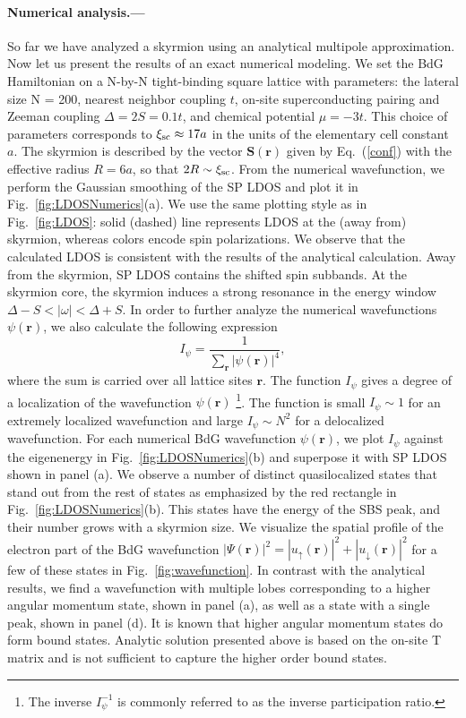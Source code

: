 \documentclass[twocolumn,showpacs,floatfix,longbibliography]{revtex4-1}
\begin{document}
\paragraph*{Numerical analysis.---} \label{sec:numerics}
So far we have analyzed a skyrmion using an analytical multipole approximation. Now let us present the results of an exact numerical modeling. We set the BdG Hamiltonian on a N-by-N tight-binding square lattice with parameters: the lateral size N = 200, nearest neighbor coupling $t$, on-site superconducting pairing and Zeeman coupling $\Delta=2S=0.1t$, and chemical potential $\mu = -3t$. This choice of parameters corresponds to $\xi_{\rm sc}\approx 17 a$ in the units of the elementary cell constant $a$. The skyrmion is described by the vector $\bm S(\bm r)$ given by Eq.~(\ref{conf}) with the effective radius $R = 6a$, so that $2R\sim \xi_{\rm sc}$. From the numerical wavefunction, we perform the Gaussian smoothing of the SP LDOS and plot it in Fig.~\ref{fig:LDOSNumerics}(a). We use the same plotting style as in Fig.~\ref{fig:LDOS}: solid (dashed) line represents LDOS at the (away from) skyrmion, whereas colors encode spin polarizations. We observe that the calculated LDOS is consistent with the results of the analytical calculation. Away from the skyrmion, SP LDOS contains the shifted spin subbands. At the skyrmion core, the skyrmion induces a strong resonance in the energy window $\Delta-S<|\omega|<\Delta+S$. In order to further analyze the numerical wavefunctions $\psi(\bm r)$, we also calculate the following expression
\begin{equation}
	I_\psi =\frac{1}{\sum_{\bm r} |\psi(\bm r)|^4},
	\label{I}
\end{equation}
where the sum is carried over all lattice sites $\bm r$. The function $I_\psi$ gives a degree of a localization of the wavefunction $\psi(\bm r)$ \footnote{The inverse $I_\psi^{-1}$ is commonly referred to as the inverse participation ratio.}. The function is small $I_\psi \sim 1$ for an extremely localized wavefunction and large $I_\psi \sim N^2$ for a delocalized wavefunction. For each numerical BdG wavefunction $\psi(\bm r)$, we plot $I_\psi$ against the eigenenergy in Fig.~\ref{fig:LDOSNumerics}(b) and superpose it with SP LDOS shown in panel (a). We observe a number of distinct quasilocalized states that stand out from the rest of states as emphasized by the red rectangle in Fig.~\ref{fig:LDOSNumerics}(b). This states have the energy of the SBS peak, and their number grows with a skyrmion size. We visualize the spatial profile of the electron part of the BdG wavefunction $|\Psi(\bm r)|^2 = |u_{\uparrow}(\bm r)|^2+|u_{\downarrow}(\bm r)|^2$  for a few of these states in Fig.~\ref{fig:wavefunction}. In contrast with the analytical results, we find a wavefunction with multiple lobes corresponding to a higher angular momentum state, shown in panel (a), as well as a state with a single peak, shown in panel (d). It is known that higher angular momentum states do form bound states. Analytic solution presented above is based on the on-site T matrix and is not sufficient to capture the higher order bound states. 
\end{document}

